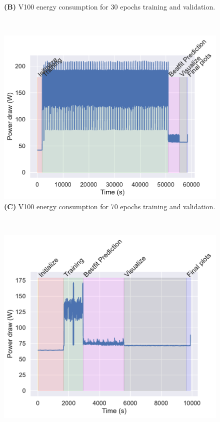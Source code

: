 \documentclass[utf8]{FrontiersinVancouver} %
\begin{document}
\begin{figure}[p]
\begin{center}
\begin{minipage}[t]{0.30\textwidth}
        {\bf (B)} V100 energy consumption for 30 epochs training and validation.
     \end{minipage}
     \ \
     \begin{minipage}[t]{0.30\textwidth}
        \includegraphics[width=1.0\linewidth]{images/v100-shaded-energy-70-epochs}
        {\bf (C)} V100 energy consumption for 70 epochs training and validation.
     \end{minipage}
     \ \
     \begin{minipage}[t]{0.30\textwidth}
        \includegraphics[width=1.0\linewidth]{images/a100-shaded-energy-2-epochs}

\end{minipage}
\end{center}
\end{figure}
\end{document}
